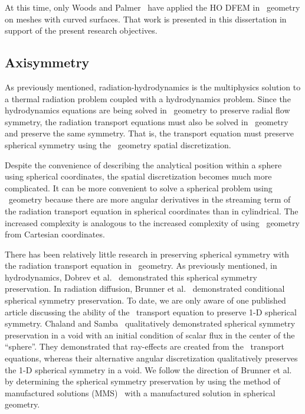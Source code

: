 \documentclass{article}
\begin{document}
At this time, only Woods and Palmer~\cite{Woods2018RZJCTT} have applied the HO DFEM in \RZ\ geometry on meshes with curved surfaces. That work is presented in this dissertation in support of the present research objectives.

\subsection{Axisymmetry}
\label{sec:AxisymmetryIntro}
As previously mentioned, radiation-hydrodynamics is the multiphysics solution to a thermal radiation problem coupled with a hydrodynamics problem. Since the hydrodynamics equations are being solved in \RZ\ geometry to preserve radial flow symmetry, the radiation transport equations must also be solved in \RZ\ geometry and preserve the same symmetry. That is, the transport equation must preserve spherical symmetry using the \RZ\ geometry spatial discretization.

Despite the convenience of describing the analytical position within a sphere using spherical coordinates, the spatial discretization becomes much more complicated. It can be more convenient to solve a spherical problem using \RZ\ geometry because there are more angular derivatives in the streaming term of the radiation transport equation in spherical coordinates than in cylindrical. The increased complexity is analogous to the increased complexity of using \RZ\ geometry from Cartesian coordinates.

There has been relatively little research in preserving spherical symmetry with the radiation transport equation in \RZ\ geometry. As previously mentioned, in hydrodynamics, Dobrev et al.~\cite{DobrevHOAxisymmetric} demonstrated this spherical symmetry preservation. In radiation diffusion, Brunner et al.~\cite{BrunnerSphericalsymmetry} demonstrated conditional spherical symmetry preservation. To date, we are only aware of one published article discussing the ability of the \RZ\ transport equation to preserve 1-D spherical symmetry. Chaland and Samba~\cite{Chaland2016SphericalSymmetry} qualitatively demonstrated spherical symmetry preservation in a void with an initial condition of scalar flux in the center of the ``sphere''. They demonstrated that ray-effects are created from the \SN\ transport equations, whereas their alternative angular discretization qualitatively preserves the 1-D spherical symmetry in a void. We follow the direction of Brunner et al.~\cite{BrunnerSphericalsymmetry} by determining the spherical symmetry preservation by using the method of manufactured solutions (MMS)~\cite{Lingus} with a manufactured solution in spherical geometry.
\end{document}
